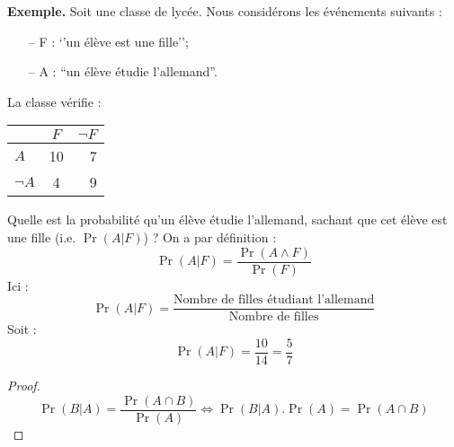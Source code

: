 

\noindent
\textbf{Exemple.}
Soit une classe de lycée. Nous considérons les événements suivants :
\begin{itemize}
\item[--] F : `'un élève est une fille'';
\item[--] A : ``un élève étudie l'allemand''.
\end{itemize}

La classe vérifie :
\begin{center}
\begin{tabular}{|l|c|r|}
  \hline
   & $F$ & $\neg F$ \\
  \hline
  $A$ & 10 & 7 \\
  $\neg A$ & 4 & 9 \\
  \hline
\end{tabular}
\end{center}

Quelle est la probabilité qu'un élève étudie l'allemand, sachant que cet élève est une fille
(i.e. $\Pr(A|F)$) ?
On a par définition :
$$
\Pr(A|F) = \frac{\Pr(A \wedge F)}{\Pr(F)}
$$
Ici :
$$
\Pr(A|F)= \frac{\text{Nombre de filles étudiant l'allemand}}
			 {\text{Nombre de filles}}
$$
Soit :
$$
\Pr(A|F) = \frac{10}{14} = \frac{5}{7}
$$

\begin{proof}
$$
\Pr(B | A) = \frac{\Pr(A\cap B)}{\Pr(A)}
\iff
\Pr(B|A) . \Pr(A) = \Pr(A\cap B) 
$$
\end{proof}


